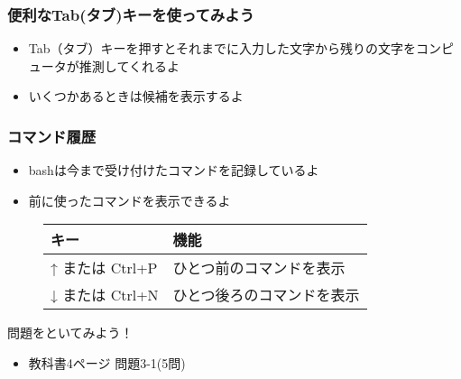 \begin{frame}
    \frametitle{便利なTab(タブ)キーを使ってみよう}
    \begin{itemize}
        \item Tab（タブ）キーを押すとそれまでに入力した文字から残りの文字をコンピュータが推測してくれるよ
        \item いくつかあるときは候補を表示するよ
    \end{itemize}
    \begin{figure}[h]
        \centering
        
    \end{figure}
\end{frame}

\begin{frame}
    \frametitle{コマンド履歴}
    \begin{itemize}
        \item bashは今まで受け付けたコマンドを記録しているよ
        \item 前に使ったコマンドを表示できるよ
    \end{itemize}
    \begin{figure}[h]
        \center
        \begin{tabular}{ll}\hline
          キー & 機能 \\ \hline
          ↑ または Ctrl+P & ひとつ前のコマンドを表示\\
          ↓ または Ctrl+N & ひとつ後ろのコマンドを表示\\ \hline
        \end{tabular}
    \end{figure}
\end{frame}

\begin{frame}
    \begin{exampleblock}{問題をといてみよう！}
        \begin{itemize}
            \item 教科書4ページ 問題3-1(5問)
        \end{itemize}
    \end{exampleblock} 
\end{frame}

